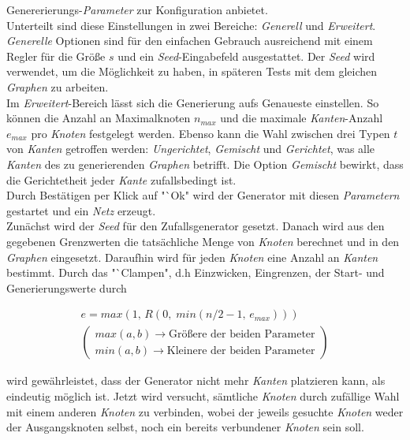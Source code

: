 \documentclass[12pt]{article}
\begin{document}
Genererierungs-\textit{Parameter} zur Konfiguration anbietet. 
\\
Unterteilt sind diese Einstellungen in zwei Bereiche: \textit{Generell} und \textit{Erweitert}. \textit{Generelle} Optionen sind für den einfachen Gebrauch ausreichend mit einem Regler für die Größe $s$ und ein \textit{Seed}-Eingabefeld ausgestattet. Der \textit{Seed} wird verwendet, um die Möglichkeit zu haben, in späteren Tests mit dem gleichen \textit{Graphen} zu arbeiten.
\\
Im \textit{Erweitert}-Bereich lässt sich die Generierung aufs Genaueste einstellen. So können die Anzahl an Maximalknoten $n_{max}$ und die maximale \textit{Kanten}-Anzahl $e_{max}$ pro \textit{Knoten} festgelegt werden. Ebenso kann die Wahl zwischen drei Typen $t$ von \textit{Kanten} getroffen werden: \textit{Ungerichtet}, \textit{Gemischt} und \textit{Gerichtet}, was alle \textit{Kanten} des zu generierenden \textit{Graphen} betrifft. Die Option \textit{Gemischt} bewirkt, dass die Gerichtetheit jeder \textit{Kante} zufallsbedingt ist.
\\
Durch Bestätigen per Klick auf "`Ok" wird der Generator mit diesen \textit{Parametern} gestartet und ein \textit{Netz} erzeugt.
\\
Zunächst wird der \textit{Seed} für den Zufallsgenerator gesetzt. Danach wird aus den gegebenen Grenzwerten die tatsächliche Menge von \textit{Knoten} berechnet und in den \textit{Graphen} eingesetzt. Daraufhin wird für jeden \textit{Knoten} eine Anzahl an \textit{Kanten} bestimmt. Durch das "`Clampen", d.h Einzwicken, Eingrenzen, der Start- und Generierungswerte durch

\vspace{-20pt}
\begin{gather*}
e = max(1,\,R(0,\;min(n/2-1,\,e_{max}))) \\
\left(\begin{aligned}
max(a, b) \to \text{Größere der beiden Parameter}\\
min(a, b) \to \text{Kleinere der beiden Parameter}
\end{aligned}
\right)
\end{gather*}

wird gewährleistet, dass der Generator nicht mehr \textit{Kanten} platzieren kann, als eindeutig möglich ist. Jetzt wird versucht, sämtliche \textit{Knoten} durch zufällige Wahl mit einem anderen \textit{Knoten} zu verbinden, wobei der jeweils gesuchte \textit{Knoten} weder der Ausgangsknoten selbst, noch ein bereits verbundener \textit{Knoten} sein soll.
\end{document}
